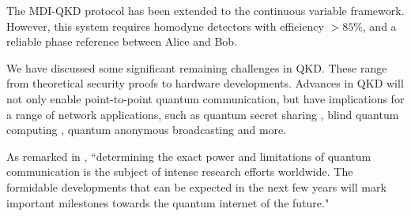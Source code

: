 The MDI-QKD protocol has been extended to the continuous variable framework. However, this system requires homodyne detectors with efficiency $>85\%$, and a reliable phase reference between Alice and Bob.  

We have discussed some significant remaining challenges in QKD. These range from theoretical security proofs to hardware developments. Advances in QKD will not only enable point-to-point quantum communication, but have implications for a range of network applications, such as quantum secret sharing \cite{bib:cleve1999share, bib:PhysRevA.61.042311, bib:PhysRevA.71.044301}, blind quantum computing \cite{bib:broadbent2009universal, bib:barz2012demonstration}, quantum anonymous broadcasting \cite{bib:christandl2005quantum} and more.

As remarked in \cite{bib:diamanti2016practical}, ``determining the exact power and limitations of quantum communication is the subject of intense research efforts worldwide. The formidable developments that can be expected in the next few years will mark important milestones towards the quantum internet of the future." 